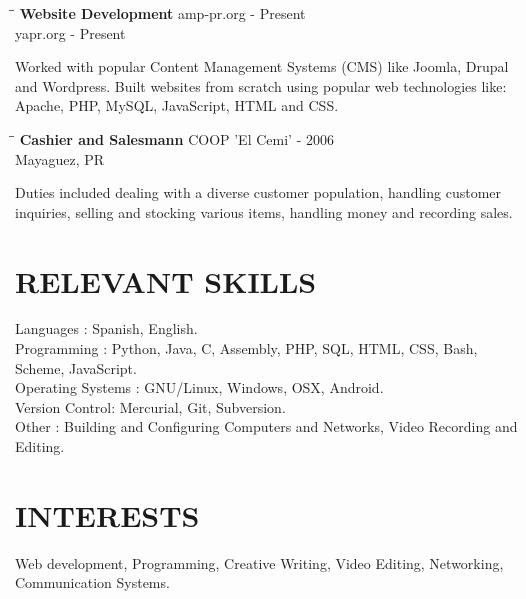 \documentclass{res}
\begin{document}
\begin{resume}
  \vspace{-0.1in}  
   \begin{tabbing}
   \hspace{2.3in}\= \hspace{2.6in}\= \kill %
    {\bf Website Development} 
    \>amp-pr.org      - Present\\
    \>yapr.org      - Present\\
   \end{tabbing}\vspace{-20pt}      %
   Worked with popular Content Management Systems (CMS) like Joomla, Drupal and Wordpress. Built websites from scratch using popular web technologies like: Apache, PHP, MySQL, JavaScript, HTML and CSS. 
   
   
   \vspace{-0.1in}  
   \begin{tabbing}
   \hspace{2.3in}\= \hspace{2.6in}\= \kill %
    {\bf Cashier and Salesmann} \>COOP ’El Cemi’      - 2006\\
                             \>Mayaguez, PR
   \end{tabbing}\vspace{-20pt}      %
    Duties included dealing with a diverse customer population, handling customer inquiries, selling and
stocking various items, handling money and recording sales.
    

\section{RELEVANT SKILLS}          
    Languages : Spanish, English. \\         
    Programming : Python, Java, C, Assembly, PHP, SQL, HTML, CSS, Bash, Scheme, JavaScript. \\
    Operating Systems : GNU/Linux, Windows, OSX, Android.\\
    Version Control: Mercurial, Git, Subversion. \\
    Other : Building and Configuring Computers and Networks, Video Recording and Editing.
 
       \section{INTERESTS}          
    Web development, Programming, Creative Writing, Video Editing, Networking, Communication Systems.    
 
\end{resume}
\end{document}
